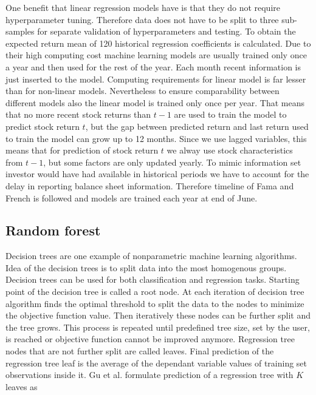 \documentclass{article}
\begin{document}
One benefit that linear regression models have is that they do not require hyperparameter tuning. Therefore data  does not have to be split to three sub-samples for separate validation of hyperparameters and testing. To obtain the expected return mean of 120 historical regression coefficients is calculated. Due to their high computing cost machine learning models are usually trained only once a year and then used for the rest of the year. Each month recent information is just inserted to the model. Computing requirements for linear model is far lesser than for non-linear models. Nevertheless to ensure comparability between different models also the linear model is trained only once per year. That means that no more recent stock returns than $t-1$ are used to train the model to predict stock return $t$, but the gap between predicted return and last return used to train the model can grow up to 12 months. Since we use lagged variables, this means that for prediction of stock return $t$ we alway use stock characteristics from $t-1$, but some factors are only updated yearly. To mimic information set investor would have had available in historical periods we have to account for the delay in reporting balance sheet information. Therefore timeline of Fama and French \citeyear{FAMA19933} is followed and models are trained each year at end of June. \par

\subsection{Random forest}

Decision trees are one example of nonparametric machine learning algorithms. Idea of the decision trees is to split data into the most homogenous groups. Decision trees can be used for both classification and regression tasks. Starting point of the decision tree is called a root node. At each iteration of decision tree algorithm finds the optimal threshold to split the data to the nodes to minimize the objective function value. Then iteratively these nodes can be further split and the tree grows. This process is repeated until predefined tree size, set by the user, is reached or objective function cannot be improved anymore. Regression tree nodes that are not further split are called leaves. Final prediction of the regression tree leaf is the average of the dependant variable values of training set observations inside it. Gu et al. \citeyear{guetal} formulate prediction of a regression tree with $K$ leaves as \par
\end{document}
